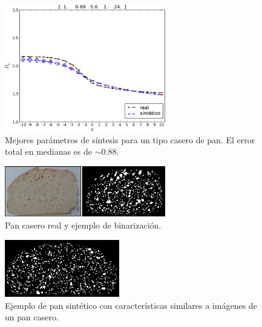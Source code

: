 \documentclass[spanish,unknownkeysallowed]{beamer}
\begin{document}
\begin{frame}
\begin{figure}
\includegraphics[width=7cm]{../figures/bestboxplot2}
\caption[Mejores parámetros de síntesis para un tipo casero de pan]{Mejores parámetros de síntesis para un tipo casero de pan. El error total en medianas es de $\sim 0.88$.}
\label{bestboxplot2}
\end{figure}

\end{frame}

\begin{frame}

\begin{figure}
\begin{center}
\includegraphics[width=7cm]{../figures/realbin2}
\caption{ Pan casero real y ejemplo de binarización.}
\label{realbin2}
\end{center}
\end{figure}

\begin{figure}
\begin{center}
\includegraphics[width=5cm]{../figures/best2}
\caption{Ejemplo de pan sintético con características similares a imágenes de un pan casero.}
\label{best2}
\end{center}
\end{figure}
\end{frame}
\end{document}
